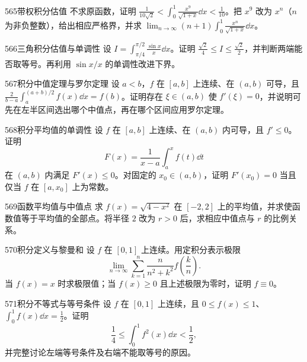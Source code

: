 \begin{exercise}{565}{带权积分估值}
不求原函数，证明 $\frac1{10\sqrt2}<\int_0^1\frac{x^9}{\sqrt{1+x}}\dd x<\frac1{10}$。把 $x^9$ 改为 $x^n$（$n$ 为非负整数），给出相应严格界，并求 $\lim_{n\to\infty}(n+1)\int_0^1\frac{x^n}{\sqrt{1+x}}\dd x$。
\end{exercise}
\begin{exercise}{566}{三角积分估值与单调性}
设 $I=\int_{\pi/4}^{\pi/2}\frac{\sin x}{x}\dd x$。证明 $\frac{\sqrt2}{4}\le I\le\frac{\sqrt2}{2}$，并判断两端能否取等号。再利用 $\sin x/x$ 的单调性改进下界。
\end{exercise}
\begin{exercise}{567}{积分中值定理与罗尔定理}
设 $a<b$，$f$ 在 $[a,b]$ 上连续、在 $(a,b)$ 可导，且 $\frac2{b-a}\int_a^{(a+b)/2}f(x)\dd x=f(b)$。证明存在 $\xi\in(a,b)$ 使 $f'(\xi)=0$，并说明可先在左半区间选出哪个中值点，再在哪个区间应用罗尔定理。
\end{exercise}
\begin{exercise}{568}{积分平均值的单调性}
设 $f$ 在 $[a,b]$ 上连续、在 $(a,b)$ 内可导，且 $f'\le0$。证明
\[
F(x)=\frac1{x-a}\int_a^xf(t)\dd t
\]
在 $(a,b)$ 内满足 $F'(x)\le0$。对固定的 $x_0\in(a,b)$，证明 $F'(x_0)=0$ 当且仅当 $f$ 在 $[a,x_0]$ 上为常数。
\end{exercise}
\begin{exercise}{569}{函数平均值与中值点}
求 $f(x)=\sqrt{4-x^2}$ 在 $[-2,2]$ 上的平均值，并求使函数值等于平均值的全部点。将半径 $2$ 改为 $r>0$ 后，求相应中值点与 $r$ 的比例关系。
\end{exercise}
\begin{exercise}{570}{积分定义与黎曼和}
设 $f$ 在 $[0,1]$ 上连续。用定积分表示极限
\[
\lim_{n\to\infty}\sum_{k=1}^n\frac{n}{n^2+k^2}f\!\left(\frac{k}{n}\right).
\]
当 $f(x)=x$ 时求极限值；当 $f(x)\ge0$ 且上述极限为零时，证明 $f\equiv0$。
\end{exercise}
\begin{exercise}{571}{积分不等式与等号条件}
设 $f$ 在 $[0,1]$ 上连续，且 $0\le f(x)\le1$、$\int_0^1f(x)\dd x=\frac12$。证明
\[
\frac14\le\int_0^1f^2(x)\dd x<\frac12,
\]
并完整讨论左端等号条件及右端不能取等号的原因。
\end{exercise}
